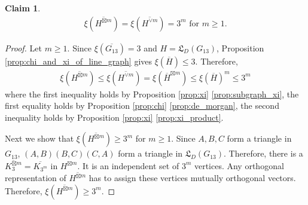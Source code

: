 \documentclass[journal, onecolumn, draftcls]{IEEEtran}
\theoremstyle{definition}
\newtheorem{claim}{Claim}
\newcommand{\frL}{\mathfrak{L}}
\begin{document}
 
\begin{claim}\label{claim:claim2}
    \begin{align*}
        \xi(\overline{H^{\boxtimes m}})=\xi(\overline{H^{\lor m}})    =3^m\text{ for }m\ge 1.
    \end{align*}
\end{claim}
\begin{proof}
Let $m\ge 1$. Since $\xi(\overline{G_{13}}) = 3$ and $H = \frL_D(G_{13})$, Proposition \ref{prop:chi_and_xi_of_line_graph} gives $\xi(\overline{H}) \le 3$. Therefore,
    \begin{align*}
    \xi(\overline{H^{\boxtimes m}})\le \xi(\overline{H^{\lor m}})=\xi(\overline{H}^{\boxtimes m}) \le \xi(\overline{H})^{m}     \le 3^m
    \end{align*}
where the first inequality holds by Proposition \ref{prop:xi}  \ref{prop:subgraph_xi}, the first equality holds by Proposition \ref{prop:chi}  \ref{prop:de_morgan}, the second inequality holds by Proposition \ref{prop:xi} \ref{prop:xi_product}. 

Next we show that $\xi(\overline{H^{\boxtimes m}})\ge 3^m$ for $m\ge 1$. Since $A,B,C$ form a triangle in $G_{13}$, $(A,B)(B,C)(C,A)$ form a triangle in $\frL_D(G_{13})$.  Therefore, there is a $\overline{K_3^{\boxtimes m}} = \overline{K_{3^m}}$ in $H^{\boxtimes m}$. It is an independent set of $3^m$ vertices. Any orthogonal representation of $\overline{H^{\boxtimes m}}$ has to assign these vertices mutually orthogonal vectors. Therefore, $\xi(\overline{H^{\boxtimes m}})\ge3^m$. 
\end{proof}
\end{document}
